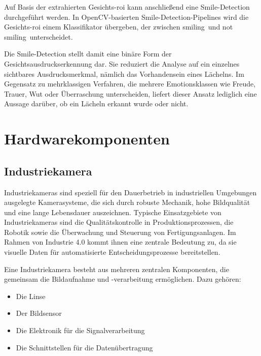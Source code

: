 Auf Basis der extrahierten Gesichts-\ac{roi} kann anschließend eine Smile-Detection durchgeführt werden. In OpenCV-basierten Smile-Detection-Pipelines wird die Gesichts-\ac{roi} einem Klassifikator übergeben, der zwischen \glqq smiling\grqq\ und \glqq not smiling\grqq\ unterscheidet.

Die Smile-Detection stellt damit eine binäre Form der Gesichtsausdruckserkennung dar. Sie reduziert die Analyse auf ein einzelnes sichtbares Ausdrucksmerkmal, nämlich das Vorhandensein eines Lächelns. Im Gegensatz zu mehrklassigen Verfahren, die mehrere Emotionsklassen wie Freude, Trauer, Wut oder Überraschung unterscheiden, liefert dieser Ansatz lediglich eine Aussage darüber, ob ein Lächeln erkannt wurde oder nicht.

\section{Hardwarekomponenten}
\subsection{Industriekamera}
Industriekameras sind speziell für den Dauerbetrieb in industriellen Umgebungen ausgelegte Kamerasysteme, die sich durch robuste Mechanik, hohe Bildqualität und eine lange Lebensdauer auszeichnen.
Typische Einsatzgebiete von Industriekameras sind die Qualitätskontrolle in Produktionsprozessen, die Robotik sowie die Überwachung und Steuerung von Fertigungsanlagen. Im Rahmen von Industrie 4.0 kommt ihnen eine zentrale Bedeutung zu, da sie visuelle Daten für automatisierte Entscheidungsprozesse bereitstellen.

Eine Industriekamera besteht aus mehreren zentralen Komponenten, die gemeinsam die Bildaufnahme und -verarbeitung ermöglichen. Dazu gehören:
\begin{itemize}
    \item Die Linse
    \item Der Bildsensor
    \item Die Elektronik für die Signalverarbeitung
    \item Die Schnittstellen für die Datenübertragung
\end{itemize}

